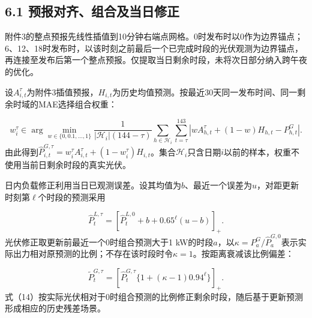 \documentclass[UTF8,a4paper,zihao=-4,fontset=windows]{ctexart}
\begin{document}
\subsection{6.1 预报对齐、组合及当日修正}
附件3的整点预报先线性插值到10分钟右端点网格。0时发布时以0作为边界锚点；6、12、18时发布时，以该时刻之前最后一个已完成时段的光伏观测为边界锚点，再连接至发布后第一个整点预报。仅提取当日剩余时段，未将次日部分纳入跨午夜的优化。
\par
设$A_{i,t}^{\tau}$为附件3插值预报，$H_{i,t}$为历史均值预测。按最近30天同一发布时间、同一剩余时域的MAE选择组合权重：
\par
\begin{equation}
w_i^{\tau}\in\arg\min_{w\in\{0,0.1,\ldots,1\}}\frac{1}{|\mathcal H_i|(144-\tau)}\sum_{h\in\mathcal H_i}\sum_{t=\tau}^{143}\left|wA_{h,t}^{\tau}+(1-w)H_{h,t}-P^G_{h,t}\right|. \tag{12}
\end{equation}
由此得到$\widehat P_{i,t}^{G,\tau}=w_i^{\tau}A_{i,t}^{\tau}+(1-w_i^{\tau})H_{i,t}$。集合$\mathcal H_i$只含日期$i$以前的样本，权重不使用当前日剩余时段的真实光伏。
\par
日内负载修正利用当日已观测误差。设其均值为$b$、最近一个误差为$u$，对距更新时刻第$\ell$个时段的预测采用
\par
\begin{equation}
\widehat P_{t}^{L,\tau}=\left[\widehat P_t^{L,0}+b+0.65^{\ell}(u-b)\right]_+. \tag{13}
\end{equation}
光伏修正取更新前最近一个0时组合预测大于1 kW的时段$a$，以$\kappa=P^G_a/\widehat P_a^{G,0}$表示实际出力相对原预测的比例；不存在该时段时令$\kappa=1$。按距离衰减该比例偏差：
\par
\begin{equation}
\widetilde P_t^{G,\tau}=\left[\widehat P_t^{G,\tau}\{1+(\kappa-1)0.94^{\ell}\}\right]_+. \tag{14}
\end{equation}
式（14）按实际光伏相对于0时组合预测的比例修正剩余时段，随后基于更新预测形成相应的历史残差场景。
\par
\end{document}
